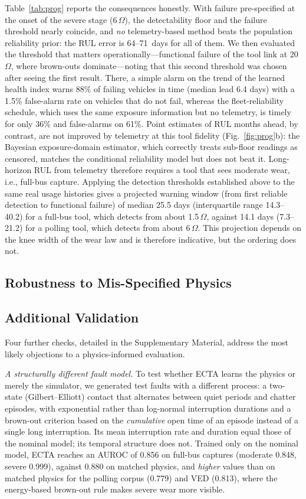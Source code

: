 Table~\ref{tab:prog} reports the consequences honestly. With failure
pre-specified at the onset of the severe stage (6\,$\Omega$), the
detectability floor and the failure threshold nearly coincide, and
\emph{no} telemetry-based method beats the population reliability prior:
the RUL error is 64--71~days for all of them. We then evaluated the
threshold that matters operationally---functional failure of the tool link
at 20\,$\Omega$, where brown-outs dominate---noting that this second
threshold was chosen after seeing the first result. There, a simple alarm
on the trend of the learned health index warns 88\% of failing vehicles
in time (median lead 6.4 days) with a 1.5\% false-alarm rate on vehicles
that do not fail, whereas the fleet-reliability schedule, which uses
the same exposure information but no telemetry, is timely for only 36\%
and false-alarms on 61\%. Point estimates of RUL months ahead, by
contrast, are not improved by telemetry at this tool fidelity
(Fig.~\ref{fig:prog}b): the Bayesian exposure-domain estimator, which
correctly treats sub-floor readings as censored, matches the conditional
reliability model but does not beat it. Long-horizon RUL from telemetry
therefore requires a tool that sees moderate wear, i.e., full-bus capture.
Applying the detection thresholds established above to the same real
usage histories gives a projected warning window (from first reliable
detection to functional failure) of median 25.5 days (interquartile range
14.3--40.2) for a full-bus tool, which detects from about 1.5\,$\Omega$,
against 14.1 days (7.3--21.2) for a polling tool, which detects from about
6\,$\Omega$. This projection depends on the knee width of the wear law and
is therefore indicative, but the ordering does not.

\subsection{Robustness to Mis-Specified Physics}
\label{sec:robust}


\subsection{Additional Validation}
\label{sec:extra}
Four further checks, detailed in the Supplementary Material, address the
most likely objections to a physics-informed evaluation.

\emph{A structurally different fault model.} To test whether ECTA learns
the physics or merely the simulator, we generated test faults with a
different process: a two-state (Gilbert--Elliott) contact that alternates
between quiet periods and chatter episodes, with exponential rather than
log-normal interruption durations and a brown-out criterion based on the
\emph{cumulative} open time of an episode instead of a single long
interruption. Its mean interruption rate and duration equal those of the
nominal model; its temporal structure does not. Trained only on the nominal
model, ECTA reaches an AUROC of 0.856 on full-bus captures (moderate 0.848,
severe 0.999), against 0.880 on matched physics, and \emph{higher} values
than on matched physics for the polling corpus (0.779) and VED (0.813),
where the energy-based brown-out rule makes severe wear more visible.

